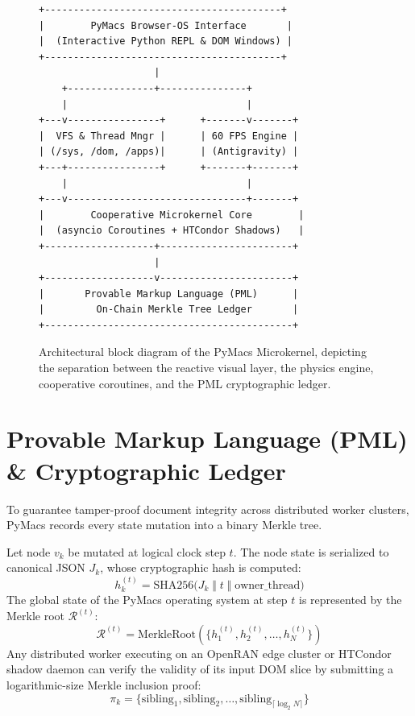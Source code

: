 \documentclass[10pt,twocolumn,letterpaper]{article}
\begin{document}
\begin{figure}[t]
\centering
\begin{verbatim}
+-----------------------------------------+
|        PyMacs Browser-OS Interface       |
|  (Interactive Python REPL & DOM Windows) |
+-----------------------------------------+
                    |
    +---------------+---------------+
    |                               |
+---v----------------+      +-------v-------+
|  VFS & Thread Mngr |      | 60 FPS Engine |
| (/sys, /dom, /apps)|      | (Antigravity) |
+---+----------------+      +-------+-------+
    |                               |
+---v-------------------------------+-------+
|        Cooperative Microkernel Core        |
|  (asyncio Coroutines + HTCondor Shadows)   |
+-------------------+-----------------------+
                    |
+-------------------v-----------------------+
|       Provable Markup Language (PML)      |
|         On-Chain Merkle Tree Ledger       |
+-------------------------------------------+
\end{verbatim}
\caption{Architectural block diagram of the PyMacs Microkernel, depicting the separation between the reactive visual layer, the physics engine, cooperative coroutines, and the PML cryptographic ledger.}
\label{fig:arch}
\end{figure}

\section{Provable Markup Language (PML) \& Cryptographic Ledger}
To guarantee tamper-proof document integrity across distributed worker clusters, PyMacs records every state mutation into a binary Merkle tree. 

Let node $v_k$ be mutated at logical clock step $t$. The node state is serialized to canonical JSON $J_k$, whose cryptographic hash is computed:
\begin{equation}
    h_k^{(t)} = \mathrm{SHA256}\big( J_k \;\Vert\; t \;\Vert\; \mathrm{owner\_thread} \big)
\end{equation}
The global state of the PyMacs operating system at step $t$ is represented by the Merkle root $\mathcal{R}^{(t)}$:
\begin{equation}
    \mathcal{R}^{(t)} = \mathrm{MerkleRoot}\left( \{ h_1^{(t)}, h_2^{(t)}, \dots, h_N^{(t)} \} \right)
\end{equation}
Any distributed worker executing on an OpenRAN edge cluster or HTCondor shadow daemon can verify the validity of its input DOM slice by submitting a logarithmic-size Merkle inclusion proof:
\begin{equation}
    \pi_k = \{ \mathrm{sibling}_1, \mathrm{sibling}_2, \dots, \mathrm{sibling}_{\lceil \log_2 N \rceil} \}
\end{equation}
\end{document}
